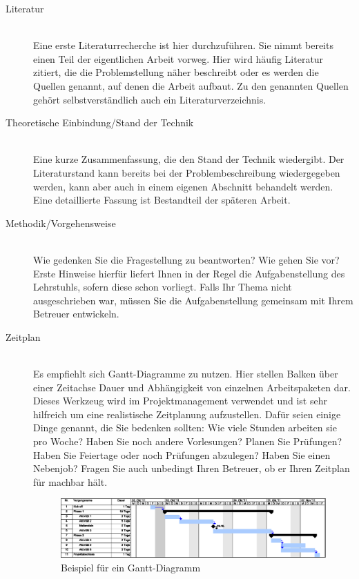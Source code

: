 \documentclass[a4paper,11pt,twoside,final]{scrreprt}
\begin{document}
\begin{description}
		\item[Literatur]  \hfill \\ 
		Eine erste Literaturrecherche ist hier durchzuführen. Sie nimmt bereits einen Teil der eigentlichen Arbeit vorweg. Hier wird häufig Literatur zitiert, die die Problemstellung näher beschreibt oder es werden die Quellen	genannt, auf denen die Arbeit aufbaut. Zu den genannten Quellen gehört selbstverständlich auch 
		ein Literaturverzeichnis.
		
		\item[Theoretische Einbindung/Stand der Technik] \hfill \\ 
		Eine kurze Zusammenfassung, die den Stand der Technik wiedergibt. Der Literaturstand kann bereits bei der
		Problembeschreibung wiedergegeben werden, kann aber auch in einem eigenen Abschnitt behandelt werden. Eine detaillierte Fassung ist Bestandteil der späteren Arbeit.
		
		
		\item[Methodik/Vorgehensweise] \hfill \\ 
		Wie gedenken Sie die Fragestellung zu beantworten? Wie gehen Sie vor? Erste Hinweise hierfür liefert Ihnen
		in der Regel die Aufgabenstellung des Lehrstuhls, sofern diese schon vorliegt. Falls Ihr Thema nicht ausgeschrieben war, müssen Sie die Aufgabenstellung gemeinsam mit Ihrem Betreuer entwickeln.
		
		
		 
		\item[Zeitplan] \hfill \\
		Es empfiehlt sich Gantt-Diagramme zu nutzen. Hier stellen Balken über einer Zeitachse Dauer und Abhängigkeit von einzelnen Arbeitspaketen dar. Dieses Werkzeug wird im Projektmanagement verwendet und ist sehr hilfreich um eine realistische Zeitplanung aufzustellen.
		Dafür seien einige Dinge genannt, die Sie bedenken sollten: Wie viele Stunden arbeiten sie pro Woche? Haben Sie noch andere Vorlesungen? Planen Sie Prüfungen? Haben Sie Feiertage oder noch Prüfungen abzulegen?
		Haben Sie einen Nebenjob? Fragen Sie auch unbedingt Ihren Betreuer, ob er Ihren Zeitplan für machbar hält.
		

\begin{figure}
\centering
\includegraphics[width=\textwidth]{Gantt_diagramm}
\caption[Gantt-Diagramm]{Beispiel für ein Gantt-Diagramm}
\label{fig:Gantt_diagramm}
\end{figure}
  
		 
		  
		 
	\end{description}
	
	
\end{document}
